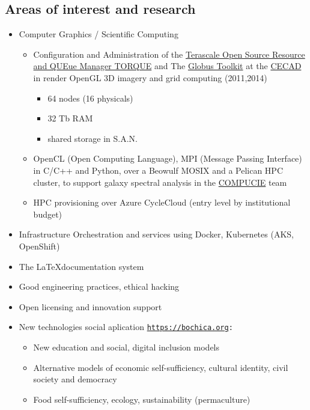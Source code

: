 \documentclass[overlapped,line,final]{res}
\begin{document}
\begin{resume}
\section{\sc Areas of interest and research}
\vspace{0.5cm}
\begin{itemize}
	\item Computer Graphics / Scientific Computing
	\begin{itemize}
		\item Configuration and Administration of the \href {https://github.com/adaptivecomputing/torque}{Terascale Open Source Resource and QUEue Manager TORQUE} and The \href{https://toolkit.globus.org/}{Globus Toolkit} at the \href{https://cecad.udistrital.edu.co/}{CECAD} in render OpenGL 3D imagery and grid computing (2011,2014)
	 \begin{itemize}
	  \item 64 nodes (16 physicals)
	  \item 32 Tb RAM
	  \item shared storage in S.A.N.
	 \end{itemize}
 \item OpenCL (Open Computing Language), MPI (Message Passing Interface) in C\slash C++ and Python, over a Beowulf MOSIX and a Pelican HPC cluster, to support galaxy spectral analysis in the \href{http://chronos.udistrital.edu.co:8095/siciud/web/Consultas.x?accion=5&idSemillero=2382}{COMPUCIE} team 
	 \item HPC provisioning over Azure CycleCloud (entry level by institutional budget)
	\end{itemize}
	\item Infrastructure Orchestration and services using Docker, Kubernetes (AKS, OpenShift)
	\item The \LaTeX documentation system	
    \item Good engineering practices, ethical hacking
	\item Open licensing and innovation support
    \item New technologies social aplication \tt \url {https://bochica.org}:
    	\begin{itemize}
		\item New education and social, digital inclusion models
		\item Alternative models of economic self-sufficiency, cultural identity, civil society and democracy
		\item Food self-sufficiency, ecology, sustainability (permaculture)
    	\end{itemize}


\end{itemize}
\end{resume}
\end{document}
